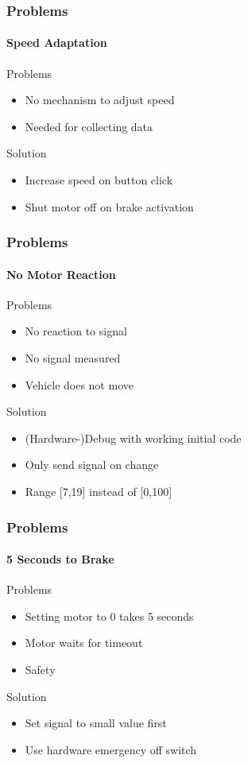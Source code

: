 \documentclass[8pt]{beamer}
\begin{document}
\begin{frame}
	\frametitle{Problems}
	\framesubtitle{Speed Adaptation}
	\begin{block}{Problems}
		\begin{itemize}
			\item No mechanism to adjust speed
			\item Needed for collecting data
		\end{itemize}
	\end{block}
	\pause
	\begin{block}{Solution}
		\begin{itemize}[<+->]
			\item Increase speed on button click
			\item Shut motor off on brake activation
		\end{itemize}
	\end{block}	
\end{frame}

\begin{frame}
	\frametitle{Problems}
	\framesubtitle{No Motor Reaction}
	\begin{block}{Problems}
		\begin{itemize}
			\item No reaction to signal
			\item No signal measured
			\item Vehicle does not move
		\end{itemize}
	\end{block}
	\pause
	\begin{block}{Solution}
		\begin{itemize}[<+->]
			\item (Hardware-)Debug with working initial code
			\item Only send signal on change
			\item Range [7,19] instead of [0,100]
		\end{itemize}
	\end{block}	
\end{frame}

\begin{frame}
	\frametitle{Problems}
	\framesubtitle{5 Seconds to Brake}
	\begin{block}{Problems}
		\begin{itemize}
			\item Setting motor to 0 takes 5 seconds
			\item Motor waits for timeout
			\item Safety
		\end{itemize}
	\end{block}
	\pause
	\begin{block}{Solution}
		\begin{itemize}[<+->]
			\item Set signal to small value first
			\item Use hardware emergency off switch
		\end{itemize}
	\end{block}	
\end{frame}
\end{document}
